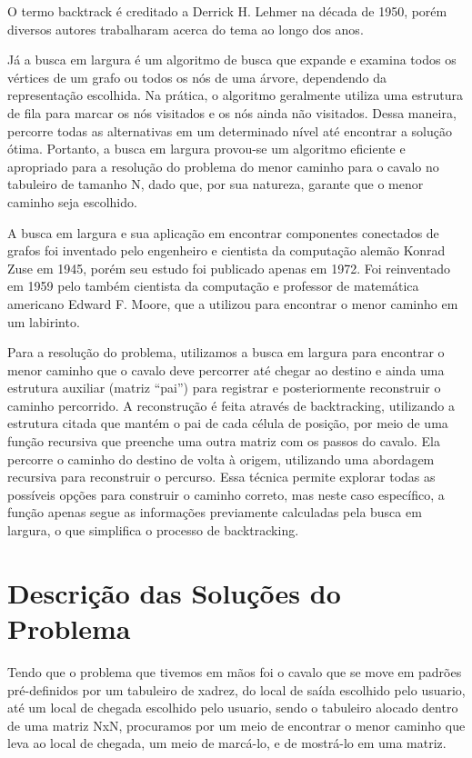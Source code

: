 \documentclass[relatorio]{IEEEtran}
\begin{document}
O termo backtrack é creditado a Derrick H. Lehmer na década de 1950, porém diversos autores trabalharam acerca do tema ao longo dos anos.

Já a busca em largura é um algoritmo de busca que expande e examina todos os vértices de um grafo ou todos os nós de uma árvore, dependendo da representação escolhida. Na prática, o algoritmo geralmente utiliza uma estrutura de fila para marcar os nós visitados e os nós ainda não visitados. Dessa maneira, percorre todas as alternativas em um determinado nível até encontrar a solução ótima. Portanto, a busca em largura provou-se um algoritmo eficiente e apropriado para a resolução do problema do menor caminho para o cavalo no tabuleiro de tamanho N, dado que, por sua natureza, garante que o menor caminho seja escolhido.

A busca em largura e sua aplicação em encontrar componentes conectados de grafos foi inventado pelo engenheiro e cientista da computação alemão Konrad Zuse em 1945, porém seu estudo foi publicado apenas em 1972. Foi reinventado em 1959 pelo também cientista da computação e professor de matemática americano Edward F. Moore, que a utilizou para encontrar o menor caminho em um labirinto.

Para a resolução do problema, utilizamos a busca em largura para encontrar o menor caminho que o cavalo deve percorrer até chegar ao destino e ainda uma estrutura auxiliar (matriz “pai”) para registrar e posteriormente reconstruir o caminho percorrido. A reconstrução é feita através de backtracking, utilizando a estrutura citada que mantém o pai de cada célula de posição, por meio de uma função recursiva que preenche uma outra matriz com os passos do cavalo. Ela percorre o caminho do destino de volta à origem, utilizando uma abordagem recursiva para reconstruir o percurso. Essa técnica permite explorar todas as possíveis opções para construir o caminho correto, mas neste caso específico, a função apenas segue as informações previamente calculadas pela busca em largura, o que simplifica o processo de backtracking.

\section{Descrição das Soluções do Problema}
Tendo que o problema que tivemos em mãos foi o cavalo que se move em padrões pré-definidos por um tabuleiro de xadrez, do local de saída escolhido pelo usuario, até um local de chegada escolhido pelo usuario, sendo o tabuleiro alocado dentro de uma matriz NxN, procuramos por um meio de encontrar o menor caminho que leva ao local de chegada, um meio de marcá-lo, e de mostrá-lo em uma matriz. 
\end{document}
